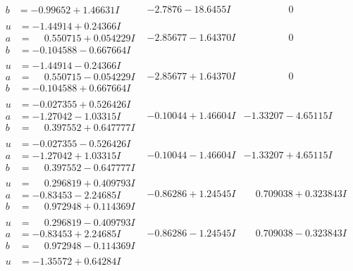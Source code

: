 \documentclass[1p]{elsarticle_modified}
\theoremstyle{definition}
\begin{document}
$$\begin{array}{c|c|c}
\begin{aligned}
b &= -0.99652 + 1.46631 I\end{aligned}
 & -2.7876 - 18.6455 I & \phantom{-0.000000 } 0 \\ \hline\begin{aligned}
u &= -1.44914 + 0.24366 I \\
a &= \phantom{-}0.550715 + 0.054229 I \\
b &= -0.104588 - 0.667664 I\end{aligned}
 & -2.85677 - 1.64370 I & \phantom{-0.000000 } 0 \\ \hline\begin{aligned}
u &= -1.44914 - 0.24366 I \\
a &= \phantom{-}0.550715 - 0.054229 I \\
b &= -0.104588 + 0.667664 I\end{aligned}
 & -2.85677 + 1.64370 I & \phantom{-0.000000 } 0 \\ \hline\begin{aligned}
u &= -0.027355 + 0.526426 I \\
a &= -1.27042 - 1.03315 I \\
b &= \phantom{-}0.397552 + 0.647777 I\end{aligned}
 & -0.10044 + 1.46604 I & -1.33207 - 4.65115 I \\ \hline\begin{aligned}
u &= -0.027355 - 0.526426 I \\
a &= -1.27042 + 1.03315 I \\
b &= \phantom{-}0.397552 - 0.647777 I\end{aligned}
 & -0.10044 - 1.46604 I & -1.33207 + 4.65115 I \\ \hline\begin{aligned}
u &= \phantom{-}0.296819 + 0.409793 I \\
a &= -0.83453 - 2.24685 I \\
b &= \phantom{-}0.972948 + 0.114369 I\end{aligned}
 & -0.86286 + 1.24545 I & \phantom{-}0.709038 + 0.323843 I \\ \hline\begin{aligned}
u &= \phantom{-}0.296819 - 0.409793 I \\
a &= -0.83453 + 2.24685 I \\
b &= \phantom{-}0.972948 - 0.114369 I\end{aligned}
 & -0.86286 - 1.24545 I & \phantom{-}0.709038 - 0.323843 I \\ \hline\begin{aligned}
u &= -1.35572 + 0.64284 I \\

\end{aligned}
\end{array}$$
\end{document}
